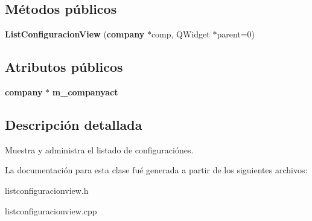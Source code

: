 \subsection*{M\'{e}todos p\'{u}blicos}
\begin{CompactItemize}
\item 
{\bf List\-Configuracion\-View} ({\bf company} $\ast$comp, QWidget $\ast$parent=0)\label{classListConfiguracionView_a0}

\end{CompactItemize}
\subsection*{Atributos p\'{u}blicos}
\begin{CompactItemize}
\item 
{\bf company} $\ast$ {\bf m\_\-companyact}\label{classListConfiguracionView_o0}

\end{CompactItemize}


\subsection{Descripci\'{o}n detallada}
Muestra y administra el listado de configuraci\'{o}nes. 



La documentaci\'{o}n para esta clase fu\'{e} generada a partir de los siguientes archivos:\begin{CompactItemize}
\item 
listconfiguracionview.h\item 
listconfiguracionview.cpp\end{CompactItemize}
